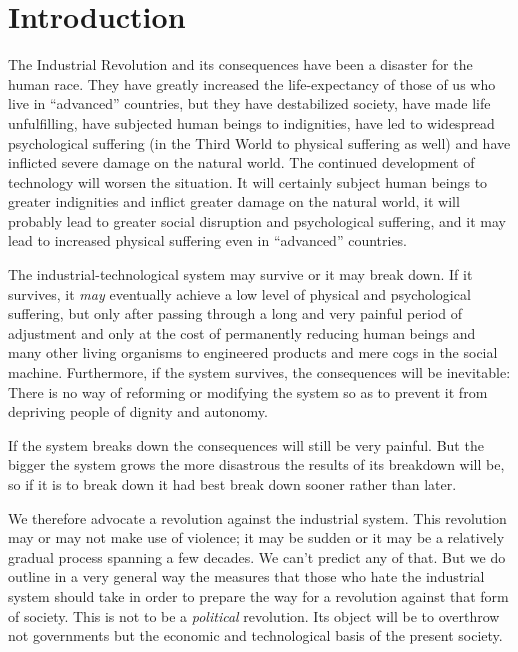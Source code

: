 \chapter{Introduction}

 The Industrial Revolution and its consequences have been a disaster for the human race. They have greatly increased the life-expectancy of those of us who live in “advanced” countries, but they have destabilized society, have made life unfulfilling, have subjected human beings to indignities, have led to widespread psychological suffering (in the Third World to physical suffering as well) and have inflicted severe damage on the natural world. The continued development of technology will worsen the situation. It will certainly subject human beings to greater indignities and inflict greater damage on the natural world, it will probably lead to greater social disruption and psychological suffering, and it may lead to increased physical suffering even in “advanced” countries.

 The industrial-technological system may survive or it may break down. If it survives, it {\em may} eventually achieve a low level of physical and psychological suffering, but only after passing through a long and very painful period of adjustment and only at the cost of permanently reducing human beings and many other living organisms to engineered products and mere cogs in the social machine. Furthermore, if the system survives, the consequences will be inevitable: There is no way of reforming or modifying the system so as to prevent it from depriving people of dignity and autonomy.

 If the system breaks down the consequences will still be very painful. But the bigger the system grows the more disastrous the results of its breakdown will be, so if it is to break down it had best break down sooner rather than later.

 We therefore advocate a revolution against the industrial system. This revolution may or may not make use of violence; it may be sudden or it may be a relatively gradual process spanning a few decades. We can’t predict any of that. But we do outline in a very general way the measures that those who hate the industrial system should take in order to prepare the way for a revolution against that form of society. This is not to be a {\em political} revolution. Its object will be to overthrow not governments but the economic and technological basis of the present society.

